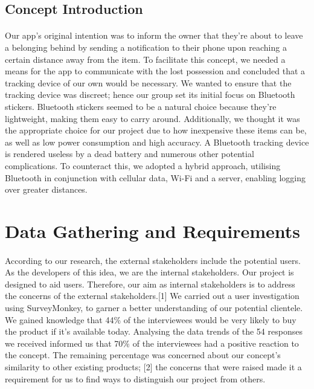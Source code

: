 \documentclass[12pt,a4paper]{article}
\begin{document}
      \subsection{Concept Introduction}
        \paragraph{}
          Our app's original intention was to inform the owner that they're about to leave a belonging behind by sending a notification to their phone upon reaching a certain distance away from the item. To facilitate this concept, we needed a means for the app to communicate with the lost possession and concluded that a tracking device of our own would be necessary. We wanted to ensure that the tracking device was discreet; hence our group set its initial focus on Bluetooth stickers. Bluetooth stickers seemed to be a natural choice because they’re lightweight, making them easy to carry around. Additionally, we thought it was the appropriate choice for our project due to how inexpensive these items can be, as well as low power consumption and high accuracy. A Bluetooth tracking device is rendered useless by a dead battery and numerous other potential complications. To counteract this, we adopted a hybrid approach, utilising Bluetooth in conjunction with cellular data, Wi-Fi and a server, enabling logging over greater distances.

    \section{Data Gathering and Requirements}
      \paragraph{}
        According to our research, the external stakeholders include the potential users. As the developers of this idea, we are the internal stakeholders. Our project is designed to aid users. Therefore, our aim as internal stakeholders is to address the concerns of the external stakeholders.[1] We carried out a user investigation using SurveyMonkey, to garner a better understanding of our potential clientele. We gained knowledge that 44\% of the interviewees would be very likely to buy the product if it’s available today. Analysing the data trends of the 54 responses we received informed us that 70\% of the interviewees had a positive reaction to the concept. The remaining percentage was concerned about our concept’s similarity to other existing products; [2] the concerns that were raised made it a requirement for us to find ways to distinguish our project from others.
\end{document}
